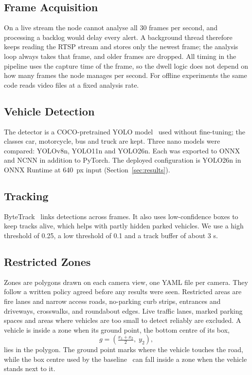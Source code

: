 \documentclass[conference]{IEEEtran}
\begin{document}
\subsection{Frame Acquisition}
On a live stream the node cannot analyse all 30 frames per second, and processing a backlog would delay every alert. A background thread therefore keeps reading the RTSP stream and stores only the newest frame; the analysis loop always takes that frame, and older frames are dropped. All timing in the pipeline uses the capture time of the frame, so the dwell logic does not depend on how many frames the node manages per second. For offline experiments the same code reads video files at a fixed analysis rate.

\subsection{Vehicle Detection}
The detector is a COCO-pretrained YOLO model~\cite{ultralytics,lin2014coco} used without fine-tuning; the classes car, motorcycle, bus and truck are kept. Three nano models were compared: YOLOv8n, YOLO11n and YOLO26n. Each was exported to ONNX and NCNN in addition to PyTorch. The deployed configuration is YOLO26n in ONNX Runtime at 640~px input (Section~\ref{sec:results}).

\subsection{Tracking}
ByteTrack~\cite{zhang2022bytetrack} links detections across frames. It also uses low-confidence boxes to keep tracks alive, which helps with partly hidden parked vehicles. We use a high threshold of 0.25, a low threshold of 0.1 and a track buffer of about 3 s.

\subsection{Restricted Zones}
Zones are polygons drawn on each camera view, one YAML file per camera. They follow a written policy agreed before any results were seen. Restricted areas are fire lanes and narrow access roads, no-parking curb strips, entrances and driveways, crosswalks, and roundabout edges. Live traffic lanes, marked parking spaces and areas where vehicles are too small to detect reliably are excluded. A vehicle is inside a zone when its ground point, the bottom centre of its box,
\begin{equation}
g = \left(\tfrac{x_1 + x_2}{2},\; y_2\right),
\label{eq:ground}
\end{equation}
lies in the polygon. The ground point marks where the vehicle touches the road, while the box centre used by the baseline~\cite{daluz2026} can fall inside a zone when the vehicle stands next to it.
\end{document}
